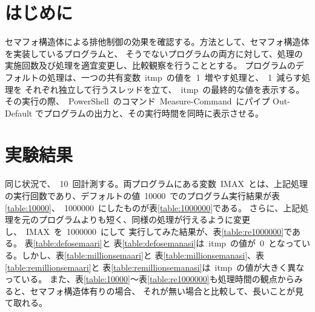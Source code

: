 \documentclass[10pt]{jarticle}
\title{\framebox{\hspace{4zw}オペレーティングシステム論 レポート1%
                 \hspace{4zw}}}
\author{情報　開発 \\
        2022311042  \\
        愛知県立大学 情報科学部 情報科学科 \\ 神野友哉}
\date{2023年11月26日}
\begin{document}
\maketitle

\section{はじめに} \label{sec:hajime}

セマフォ構造体による排他制御の効果を確認する。方法として、セマフォ構造体を実装しているプログラムと、
そうでないプログラムの両方に対して、処理の実施回数及び処理を適宜変更し、比較観察を行うこととする。
プログラムのデフォルトの処理は、一つの共有変数\ itmp\ の値を\ 1\ 増やす処理と、\ 1\ 減らす処理を
それぞれ独立して行うスレッドを立て、\ itmp\ の最終的な値を表示する。その実行の際、\ PowerShell\ のコマンド\
Measure-Command\ にパイプ Out-Default でプログラムの出力と、その実行時間を同時に表示させる。

\section{実験結果} \label{sec:kekka}
同じ状況で、\ 10\ 回計測する。両プログラムにある変数\ IMAX\ とは、上記処理の実行回数であり、デフォルトの値\ 10000\ 
でのプログラム実行結果が表\ref{table:10000}、\ 1000000\ にしたものが表\ref{table:1000000}である。
さらに、上記処理を元のプログラムよりも短く、同様の処理が行えるように変更し、\ IMAX\  を\ 1000000\ にして
実行してみた結果が、表\ref{table:re1000000}である。
表\ref{table:defosemaari}と
表\ref{table:defosemanasi}は\ itmp\ の値が\ 0\ となっている。しかし、表\ref{table:millionsemaari}と
表\ref{table:millionsemanasi}、表\ref{table:remillionsemaari}と
表\ref{table:remillionsemanasi}は\ itmp\ の値が大きく異なっている。
また、表\ref{table:10000}～表\ref{table:re1000000}も処理時間の観点からみると、セマフォ構造体有りの場合、
それが無い場合と比較して、長いことが見て取れる。
\end{document}

